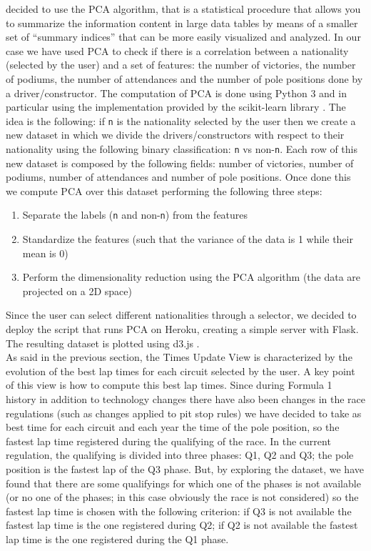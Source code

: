 \documentclass[11pt,twocolumn,letterpaper]{article}
\begin{document}
decided to use the PCA algorithm, that is a statistical procedure that allows you to summarize the information content in large data tables by means of a smaller set of “summary indices” 
that can be more easily visualized and analyzed. In our case we have used PCA to check if there is a correlation between a nationality (selected by the user) and a set of features:
the number of victories, the number of podiums, the number of attendances and the number of pole positions done by a driver/constructor. The computation of PCA is done using Python 3 
and in particular using the implementation provided by the scikit-learn library \cite{Scikit-learn}. The idea is the following: if \texttt{n} is the nationality selected by the user 
then we create a new dataset in which we divide the drivers/constructors with respect to their nationality using the following binary classification: \texttt{n} vs non-\texttt{n}. 
Each row of this new dataset is composed by the following fields: number of victories, number of podiums, number of attendances and number of pole positions. Once done this we compute
PCA over this dataset performing the following three steps:
\begin{enumerate}
	\item Separate the labels (\texttt{n} and non-\texttt{n}) from the features
	\item Standardize the features (such that the variance of the data is 1 while their mean is 0)
	\item Perform the dimensionality reduction using the PCA algorithm (the data are projected on a 2D space)
\end{enumerate}
Since the user can select different nationalities through a selector, we decided to deploy the script that runs PCA on Heroku\cite{Heroku}, creating a simple server with Flask\cite{Flask}.
The resulting dataset is plotted using d3.js \cite{D3}.\\
As said in the previous section, the Times Update View is characterized by the evolution of the best lap times for each circuit selected by the user. A key point of this view is how to 
compute this best lap times. Since during Formula 1 history in addition to technology changes there have also been changes in the race regulations (such as changes applied to pit stop
rules) we have decided to take as best time for each circuit and each year the time of the pole position, so the fastest lap time registered during the qualifying of the race.
In the current regulation, the qualifying is divided into three phases: Q1, Q2 and Q3; the pole position is the fastest lap of the Q3 phase. But, by exploring the dataset, we have found
that there are some qualifyings for which one of the phases is not available (or no one of the phases; in this case obviously the race is not considered) so the fastest lap time is chosen
with the following criterion: if Q3 is not available the fastest lap time is the one registered during Q2; if Q2 is not available the fastest lap time is the one registered during
the Q1 phase.
\end{document}

